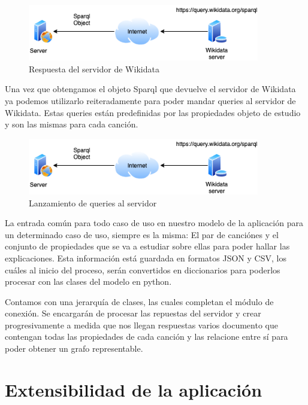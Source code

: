 \begin{figure}[h!]
	\centering
	\includegraphics[width = 0.9\textwidth]{Imagenes/Bitmap/conexionReturn.png}
	\caption{Respuesta del servidor de Wikidata}
	\label{fig:diagramaCS}
\end{figure}

Una vez que obtengamos el objeto Sparql que devuelve el servidor de Wikidata ya podemos utilizarlo reiteradamente para poder mandar queries al servidor de Wikidata. Estas queries están predefinidas por las propiedades objeto de estudio y son las mismas para cada canción.

\begin{figure}[h!]
	\centering
	\includegraphics[width = 0.9\textwidth]{Imagenes/Bitmap/conexionQueries.png}
	\caption{Lanzamiento de queries al servidor}
	\label{fig:diagramaCS}
\end{figure}


La entrada común para todo caso de uso en nuestro modelo de la aplicación para un determinado caso de uso, siempre es la misma: El par de canciónes y el conjunto de propiedades que se va a estudiar sobre ellas para poder hallar las explicaciones. Esta información está guardada en formatos JSON y CSV, los cuáles al inicio del proceso, serán convertidos en diccionarios para poderlos procesar con las clases del modelo en python. 

Contamos con una jerarquía de clases, las cuales completan el módulo de conexión. Se encargarán de procesar las repuestas del servidor y crear progresivamente a medida que nos llegan respuestas varios documento que contengan todas las propiedades de cada canción y las relacione entre sí para poder obtener un grafo representable.








\section{Extensibilidad de la aplicación}

